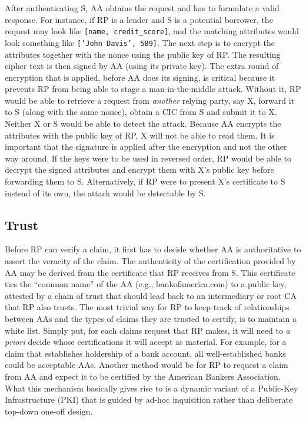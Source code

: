 \documentclass[conference]{IEEEtran}
\begin{document}
After authenticating {\sf S}, {\sf AA} obtains the request and has to formulate a valid response. For instance, if {\sf RP} is a lender and {\sf S} is a potential borrower, the request may look like {\tt [name, credit\_score]}, and the matching attributes would look something like {\tt ['John Davis', 589]}. The next step is to encrypt the attributes together with the nonce using the public key of {\sf RP}. The resulting cipher text is then signed by {\sf AA} (using its private key). The extra round of encryption that is applied, before {\sf AA} does its signing, is critical because 
it prevents {\sf RP} from being able to stage a man-in-the-middle attack. Without it, {\sf RP} would be able to retrieve a request from \emph{another} relying party, say {\sf X}, forward it to {\sf S} (along with the same nonce), obtain a CIC from {\sf S} and submit it to {\sf X}. Neither {\sf X} or {\sf S} would be able to detect the attack. Because {\sf AA} encrypts the attributes with the public key of {\sf RP}, {\sf X} will not be able to read them. It is important that the signature is applied after the encryption and not the other way around. If the keys were to be used in reversed order, {\sf RP} would be able to decrypt the signed attributes and encrypt them with {\sf X}'s public key before forwarding them to {\sf S}. Alternatively, if {\sf RP} were to present {\sf X}'s certificate to {\sf S} instead of its own, the attack would be detectable by {\sf S}.

\subsection{Trust}
Before {\sf RP} can verify a claim, it first has to decide whether {\sf AA} is authoritative to assert the veracity of the claim. The authenticity of the certification provided by {\sf AA} may be derived from the certificate that {\sf RP} receives from {\sf S}. This certificate ties the ``common name'' of the {\sf AA} (e.g., bankofamerica.com) to a public key, attested by a chain of trust that should lead back to an intermediary or root CA that {\sf RP} also trusts. The most trivial way for {\sf RP} to keep track of relationships between {\sf AA}s and the types of claims they are trusted to certify, is to maintain a white list. Simply put, for each claims request that {\sf RP} makes, it will need to \emph{a priori} decide whose certifications it will accept as material. For example, for a claim that establishes holdership of a bank account, all well-established banks could be acceptable {\sf AA}s. Another method would be for {\sf RP} to request a claim from {\sf AA} and expect it to be certified by the American Bankers Association. What this mechanism basically gives rise to is a dynamic variant of a Public-Key Infrastructure (PKI) that is guided by ad-hoc inquisition rather than deliberate top-down one-off design.
\end{document}
